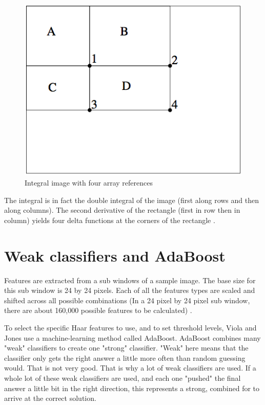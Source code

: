 \begin{figure}[!h]
\begin{center}
\noindent \includegraphics[scale=0.6]{figures/integral_image_four_array} 
\newline
\caption{Integral image with four array references}
\label{integral_image_four_array}
\end{center} 
\end{figure}

\noindent The integral is in fact the double integral of the image (first along rows and then along columns). The second derivative of the rectangle (first in row then in column) yields four delta functions at the corners of the rectangle \cite{VIO01}. 
\newline

\section{Weak classifiers and AdaBoost}

\vspace{\baselineskip}
\noindent Features are extracted from a sub windows of a sample image. The base size for this sub window is 24 by 24 pixels. Each of all the features types are scaled and shifted across all possible combinations (In a 24 pixel by 24 pixel sub window, there are about 160,000 possible features to be calculated) \cite{SMY07}.
\newline

\noindent To select the specific Haar features to use, and to set threshold levels, Viola and Jones use a machine-learning method called AdaBoost. AdaBoost combines many "weak" classifiers to create one "strong" classifier. "Weak" here means that the classifier only gets the right answer a little more often than random guessing would. That is not very good. That is why a lot of weak classifiers are used. If a whole lot of these weak classifiers are used, and each one "pushed" the final answer a little bit in the right direction, this represents a strong, combined for to arrive at the correct solution. 
\newline

